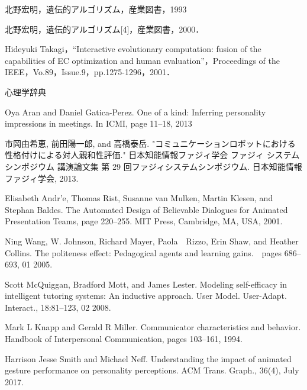 \renewcommand{\bibname}{参考文献}

\begin{thebibliography}{27} %




北野宏明，遺伝的アルゴリズム，産業図書，1993


北野宏明，遺伝的アルゴリズム[4]，産業図書，2000．


Hideyuki Takagi，“Interactive evolutionary computation: fusion of the capabilities of EC optimization and human evaluation”，Proceedings of the IEEE，Vo.89，Issue.9，pp.1275-1296，2001．

心理学辞典

Oya Aran and Daniel Gatica-Perez. One of a kind: Inferring personality impressions in meetings. In ICMI, page 11–18, 2013

市岡由希恵, 前田陽一郎, and 高橋泰岳. "コミュニケーションロボットにおける性格付けによる対人親和性評価." 日本知能情報ファジィ学会 ファジィ システム シンポジウム 講演論文集 第 29 回ファジィシステムシンポジウム. 日本知能情報ファジィ学会, 2013.

Elisabeth Andr'e, Thomas Rist, Susanne van Mulken, Martin Klesen, and Stephan Baldes. The Automated Design of Believable Dialogues for Animated Presentation Teams, page 220–255. MIT Press, Cambridge, MA, USA, 2001.

Ning Wang, W. Johnson, Richard Mayer, Paola　Rizzo, Erin Shaw, and Heather Collins. The politeness effect: Pedagogical agents and learning gains.　pages 686–693, 01 2005.


Scott McQuiggan, Bradford Mott, and James Lester. Modeling self-efficacy in intelligent tutoring systems: An inductive approach. User Model. User-Adapt. Interact., 18:81–123, 02 2008.


Mark L Knapp and Gerald R Miller. Communicator characteristics and behavior. Handbook of Interpersonal Communication, pages 103–161, 1994.


Harrison Jesse Smith and Michael Neff. Understanding the impact of animated gesture performance on personality perceptions. ACM Trans. Graph., 36(4), July 2017.


\end{thebibliography}
